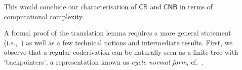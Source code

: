 \documentclass[manuscript,screen]{acmart}
\theoremstyle{definition}
\theoremstyle{remark}
\newcommand{\denot}[1]{f_{#1}}
\newcommand{\bc}{\mathsf{B}}
\newcommand{\nested}{\mathsf{N}}
\newcommand{\der}{\mathcal{D}}
\newcommand{\cyclic}{\mathsf{C}}
\newcommand{\cbc}{\cyclic\bc}
\newcommand{\ncbc}{\cyclic\nested\bc}
\begin{document}
This would conclude  our characterisation of $\cbc $ and $\ncbc$ in terms of computational complexity. 

A formal proof of the translation lemma requires a more general statement (i.e.,~) as well as a few technical notions and intermediate results. 
First, we observe that a regular coderivation can be naturally seen as a finite tree with `backpointers', a representation known as \emph{cycle normal form}, cf.~\cite{Brotherston05,brotherston2011sequent}.  















\end{document}
